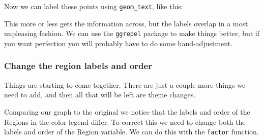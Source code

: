 \documentclass[]{book}
\newenvironment{Shaded}{\begin{snugshade}}{\end{snugshade}}
\newcommand{\KeywordTok}[1]{\textcolor[rgb]{0.13,0.29,0.53}{\textbf{#1}}}
\newcommand{\DataTypeTok}[1]{\textcolor[rgb]{0.13,0.29,0.53}{#1}}
\newcommand{\DecValTok}[1]{\textcolor[rgb]{0.00,0.00,0.81}{#1}}
\newcommand{\StringTok}[1]{\textcolor[rgb]{0.31,0.60,0.02}{#1}}
\newcommand{\OperatorTok}[1]{\textcolor[rgb]{0.81,0.36,0.00}{\textbf{#1}}}
\newcommand{\NormalTok}[1]{#1}
\begin{document}
Now we can label these points using \texttt{geom\_text}, like this:

\begin{Shaded}
\end{Shaded}

This more or less gets the information across, but the labels overlap in
a most unpleasing fashion. We can use the \texttt{ggrepel} package to
make things better, but if you want perfection you will probably have to
do some hand-adjustment.

\begin{Shaded}
\end{Shaded}

\subsubsection{Change the region labels and
order}\label{change-the-region-labels-and-order}

Things are starting to come together. There are just a couple more
things we need to add, and then all that will be left are theme changes.

Comparing our graph to the original we notice that the labels and order
of the Regions in the color legend differ. To correct this we need to
change both the labels and order of the Region variable. We can do this
with the \texttt{factor} function.
\end{document}
